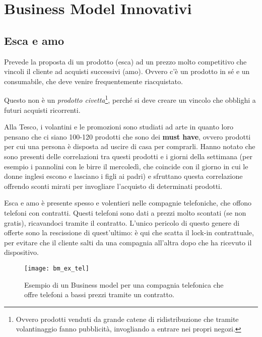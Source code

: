 \chapter{Business Model Innovativi}

\section{Esca e amo}

Prevede la proposta di un prodotto (esca) ad un prezzo molto competitivo che
vincoli il cliente ad acquisti successivi (amo). Ovvero c'è un prodotto in sé e
un consumabile, che deve venire frequentemente riacquistato.

Questo non è un \textit{prodotto civetta}\footnote{Ovvero prodotti venduti da
grande catene di ridistribuzione che tramite volantinaggio fanno pubblicità,
invogliando a entrare nei propri negozi.}, perché si deve creare un vincolo che
obblighi a futuri acquisti ricorrenti.

\begin{example}
Alla Tesco, i volantini e le promozioni sono studiati ad arte in quanto loro
pensano che ci siano 100-120 prodotti che sono dei \textbf{must have}, ovvero
prodotti per cui una persona è disposta ad uscire di casa per comprarli. Hanno
notato che sono presenti delle correlazioni tra questi prodotti e i
giorni della settimana (per esempio i pannolini con le birre il mercoledì, che
coincide con il giorno in cui le donne inglesi escono e lasciano i figli ai
padri) e sfruttano questa correlazione offrendo sconti mirati per invogliare
l'acquisto di determinati prodotti.
\end{example}

\noindent Esca e amo è presente spesso e volentieri nelle compagnie
telefoniche, che offono telefoni con contratti. Questi telefoni sono dati a
prezzi molto scontati (se non gratis), ricavandoci tramite il contratto. L'unico
pericolo di questo genere di offerte sono la rescissione di quest'ultimo: è qui
che scatta il lock-in contrattuale, per evitare che il cliente salti da una
compagnia all'altra dopo che ha ricevuto il dispositivo.


\begin{figure}[t]
 \centering
 \texttt{[image: bm\_ex\_tel]}
 \caption[Business model per compagnia telefonica]{Esempio di un Business model
per una compagnia telefonica che offre telefoni a bassi prezzi tramite un
contratto.}
 \label{fig:bmi:ct}
\end{figure}

